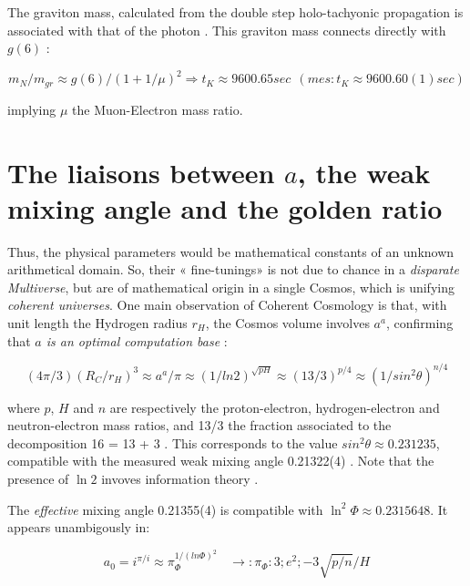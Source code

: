 \documentclass[a4paper,9pt]{article}
\begin{document}
The graviton mass, calculated from the double step holo-tachyonic propagation is associated with that of the photon \cite{Sanchez}. This graviton mass connects directly with $g(6)$ :

\begin{equation}
m_N/m_{gr} \approx g(6)/(1+1/\mu)^2 \Rightarrow    t_K  \approx  9600.65 sec ~~(mes : t_K \approx 9600.60(1) sec)    
\end{equation}

implying $\mu$ the  Muon-Electron mass ratio. 

  
   

\section{The liaisons between $a$, the weak mixing angle and the golden ratio}

Thus, the physical parameters would be mathematical constants of an unknown arithmetical domain. So, their « fine-tunings» is not due to chance in a \textit {disparate Multiverse}, but are of mathematical origin in a single Cosmos, which is unifying \textit{coherent universes}. One main observation of Coherent Cosmology is that, with unit length the Hydrogen radius $r_H$, the Cosmos volume involves $a^a$, confirming that \textit{$a$ is an optimal computation base}  \cite{Sanchez}:

\begin{equation}
    (4\pi /3) (R_C/r_H)^3 \approx a^a/\pi \approx (1/ln2)^{\sqrt{pH}} \approx (13/3)^{p/4} \approx (1/sin^2\theta)^{n/4} 
\end{equation}

where $p$, $H$ and $n$ are respectively the proton-electron, hydrogen-electron and neutron-electron mass ratios, and 13/3 the fraction associated to the decomposition 16 = 13 + 3 \cite{Sanchez1}. This corresponds to the value $sin^2\theta \approx 0.231235$, compatible with the measured weak mixing angle 0.21322(4) \cite{Tanabashi}. Note that the presence of $\ln{2}$ invoves information theory \cite{Shannon}. 


The \textit {effective} mixing angle 0.21355(4) \cite{Tanabashi} is compatible with $\ln^2{\Phi} \approx 0.2315648$. It appears unambigously in:

\begin{equation}
a_0 = i^{\pi/i} \approx \pi_{\Phi}^{1/(ln\Phi) ^2} ~~~~\rightarrow : \pi_{\Phi}: 3; e^2; -3\sqrt{p/n}/H
\end{equation}
\end{document}
